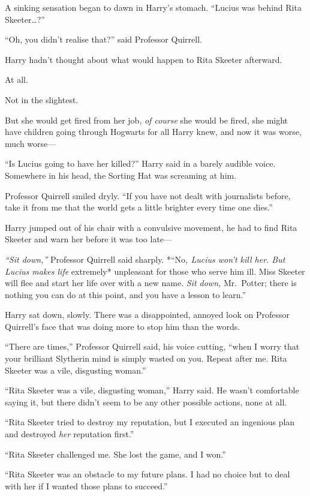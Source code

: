 A sinking sensation began to dawn in Harry's stomach. ``Lucius was
behind Rita Skeeter\ldots{}?''

``Oh, you didn't realise that?'' said Professor Quirrell.

Harry hadn't thought about what would happen to Rita Skeeter afterward.

At all.

Not in the slightest.

But she would get fired from her job, \emph{of course} she would be
fired, she might have children going through Hogwarts for all Harry
knew, and now it was worse, much worse---

``Is Lucius going to have her killed?'' Harry said in a barely audible
voice. Somewhere in his head, the Sorting Hat was screaming at him.

Professor Quirrell smiled dryly. ``If you have not dealt with
journalists before, take it from me that the world gets a little
brighter every time one dies.''

Harry jumped out of his chair with a convulsive movement, he had to find
Rita Skeeter and warn her before it was too late---

\emph{``Sit down,''} Professor Quirrell said sharply. *``No\emph{,
Lucius won't kill her. But Lucius makes life }extremely* unpleasant for
those who serve him ill. Miss Skeeter will flee and start her life over
with a new name. \emph{Sit down,} Mr.~Potter; there is nothing you can
do at this point, and you have a lesson to learn.''

Harry sat down, slowly. There was a disappointed, annoyed look on
Professor Quirrell's face that was doing more to stop him than the
words.

``There are times,'' Professor Quirrell said, his voice cutting, ``when
I worry that your brilliant Slytherin mind is simply wasted on you.
Repeat after me. Rita Skeeter was a vile, disgusting woman.''

``Rita Skeeter was a vile, disgusting woman,'' Harry said. He wasn't
comfortable saying it, but there didn't seem to be any other possible
actions, none at all.

``Rita Skeeter tried to destroy my reputation, but I executed an
ingenious plan and destroyed \emph{her} reputation first.''

``Rita Skeeter challenged me. She lost the game, and I won.''

``Rita Skeeter was an obstacle to my future plans. I had no choice but
to deal with her if I wanted those plans to succeed.''

